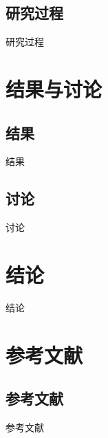 \documentclass{beamer}
\begin{document}
\subsection{研究过程}
\begin{frame}{研究过程}
\end{frame}
\section{结果与讨论}
\subsection{结果}
\begin{frame}{结果}
\end{frame}
\subsection{讨论}
\begin{frame}{讨论}
\end{frame}
\section{结论}
\begin{frame}{结论}
\end{frame}
\section{参考文献}
\subsection{参考文献}
\begin{frame}{参考文献}
    
\end{frame}
\end{document}
